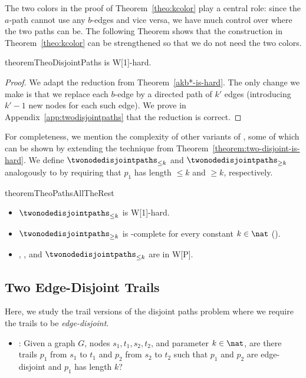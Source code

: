 \documentclass[a4paper,english]{lipics-v2016}
\theoremstyle{plain}
\begin{document}
The two colors in the proof of Theorem~\ref{theo:kcolor} play a central role:
since the $a$-path cannot use any $b$-edges and vice
versa, we have much control over where the two paths can be. The following Theorem
shows that the construction in Theorem~\ref{theo:kcolor} can be
strengthened so that we do not need the two colors.
\begin{restatable}{theorem}{TheoDisjointPaths}\label{theorem:two-disjoint-is-hard}
  \knodedisjointpaths is W[1]-hard.
\end{restatable}
\begin{proof}
  We adapt the reduction from Theorem~\ref{akb*-is-hard}.  The only
  change we make is that we replace each $b$-edge by a
  directed path of $k'$ edges (introducing $k'-1$ new nodes for each
  such edge). We prove in Appendix~\ref{app:twodisjointpaths} that the reduction is correct.
\end{proof}


For completeness, we mention the complexity of other variants of
\knodedisjointpaths, some of which can be shown by extending the technique
from Theorem~\ref{theorem:two-disjoint-is-hard}. We define $\twonodedisjointpaths_{\leq k}$ and
$\twonodedisjointpaths_{\geq k}$ analogously to \knodedisjointpaths by
requiring that $p_1$ has length $\leq k$ and $\geq k$, respectively.
\begin{restatable}{theorem}{TheoPathsAllTheRest}\label{theo:3statements}
  \begin{itemize}
  \item   $\twonodedisjointpaths_{\leq k}$ is W[1]-hard.
  \item   $\twonodedisjointpaths_{\geq k}$ is \np-complete for every
    constant $k \in \nat$ (\cite{FortuneHW-TCS80}).
  \item \knodecolordisjointpaths, \knodedisjointpaths, and $\twonodedisjointpaths_{\leq k}$ are in W[P].
      \end{itemize}
\end{restatable}

\subsection{Two Edge-Disjoint Trails}\label{sec:twoedgedisjoint}
Here, we study the trail versions of the disjoint paths problem where
we require the trails to be \emph{edge-disjoint}.
\begin{itemize}
\item \kedgedisjointpaths: Given a graph $G$, nodes $s_1,t_1, s_2, t_2$, and parameter $k \in \nat$, are there trails $p_1$ from $s_1$ to $t_1$ and $p_2$ from $s_2$ to $t_2$ such that $p_1$ and $p_2$ are edge-disjoint and $p_1$ has length $k$?
\end{itemize}
\end{document}
